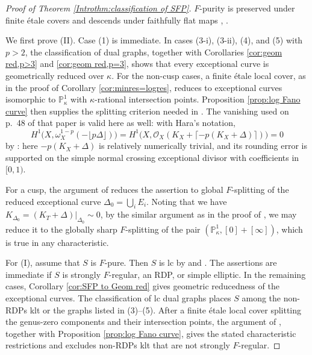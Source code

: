 \documentclass[12pt]{amsart}
\newcommand{\PP}{\mathbb{P}}
\newcommand{\sO}{\mathcal{O}}
\theoremstyle{plain}
\theoremstyle{definition}
\theoremstyle{remark}
\newtheorem{defn and notation}[thm]{Definition and Notation}
\theoremstyle{plain}
\numberwithin{equation}{thm}
\begin{document}
\begin{proof}[Proof of Theorem \ref{Introthm:classification of SFP}]
$F$-purity is preserved under finite \'etale covers and descends under faithfully flat maps
\cite[Proposition 5.13]{HR}, \cite[Theorem 4.8]{Hara-Watanabe}.

We first prove (II).
Case (1) is immediate.
In cases (3-i), (3-ii), (4), and (5) with $p>2$, the classification of dual graphs, together with Corollaries \ref{cor:geom red,p>3} and \ref{cor:geom red,p=3}, shows that every exceptional curve is geometrically reduced over $\kappa$.
For the non-cusp cases, a finite \'etale local cover, as in the proof of Corollary \ref{cor:minres=logres}, reduces to exceptional curves isomorphic to $\PP^1_\kappa$ with $\kappa$-rational intersection points.
Proposition \ref{prop:log Fano curve} then supplies the splitting criterion needed in \cite[Section 4.2]{Hara(two-dim)}.
The vanishing used on p.~48 of that paper is valid here as well: with Hara's notation,
\[
H^1\bigl(X,\omega_X^{1-p}(-\lfloor p\Delta\rfloor)\bigr)
=H^1\bigl(X,\sO_X(K_X+\lceil-p(K_X+\Delta)\rceil)\bigr)=0
\]
by \cite[Theorem 10.4]{Kol13}: here $-p(K_X+\Delta)$ is relatively numerically trivial, and its rounding error is supported on the simple normal crossing exceptional divisor with coefficients in $[0,1)$.

For a cusp, the argument of \cite[Proposition 4.7]{Hara(two-dim)} reduces the assertion to global $F$-splitting of the reduced exceptional curve $\Delta_0 = \bigcup_i E_i$.
Noting that we have $K_{\Delta_0} = (K_T+ \Delta)|_{\Delta_0} \sim 0$, by the similar argument as in the proof of \cite[Claim 4.8.1]{Hara(two-dim)}, we may reduce it to the globally sharp $F$-splitting of the pair $(\PP^1_{\kappa}, [0]+[\infty])$, which is true in any characteristic.

For (I), assume that $S$ is $F$-pure.
Then $S$ is lc by \cite[Theorem 3.3]{Hara-Watanabe} and \cite[Theorem 4.3]{SS10}.
The assertions are immediate if $S$ is strongly $F$-regular, an RDP, or simple elliptic.
In the remaining cases, Corollary \ref{cor:SFP to Geom red} gives geometric reducedness of the exceptional curves.
The classification of lc dual graphs places $S$ among the non-RDPs klt or the graphs listed in (3)--(5).
After a finite \'etale local cover splitting the genus-zero components and their intersection points, the argument of \cite[Sections 4.2 and 4.4]{Hara(two-dim)}, together with Proposition \ref{prop:log Fano curve}, gives the stated characteristic restrictions and excludes non-RDPs klt that are not strongly $F$-regular.
\end{proof}
\end{document}
